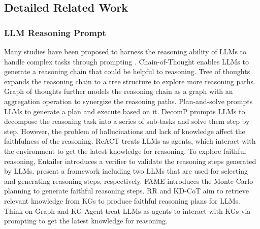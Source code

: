 \subsection{Detailed Related Work}

\subsubsection{LLM Reasoning Prompt}

Many studies have been proposed to harness the reasoning ability of LLMs to handle complex tasks through prompting \citep{wei2022chain,wang2022self,yao2023tree,besta2023graph,pan2023integrating,zheng2023large,jin2023time,jin2024position}. Chain-of-Thought \citep{wei2022chain} enables LLMs to generate a reasoning chain that could be helpful to reasoning. Tree of thoughts \citep{yao2023tree} expands the reasoning chain to a tree structure to explore more reasoning paths. Graph of thoughts \citep{besta2023graph} further models the reasoning chain as a graph with an aggregation operation to synergize the reasoning paths.
Plan-and-solve \citep{wang2023plan} prompts LLMs to generate a plan and execute based on it. DecomP \citep{he2021improving} prompts LLMs to decompose the reasoning task into a series of sub-tasks and solve them step by step. However, the problem of hallucinations and lack of knowledge affect the faithfulness of the reasoning. ReACT \citep{yao2022react} treats LLMs as agents, which interact with the environment to get the latest knowledge for reasoning. To explore faithful reasoning, Entailer \citep{tafjord2022entailer} introduces a verifier to validate the reasoning steps generated by LLMs. \citet{creswell2022faithful} present a framework including two LLMs that are used for selecting and generating reasoning steps, respectively.
FAME \citep{hong2023faithful} introduces the Monte-Carlo planning to generate faithful reasoning steps. RR \citep{he2022rethinking} and KD-CoT \cite{wang2023knowledge} aim to retrieve relevant knowledge from KGs to produce faithful reasoning plans for LLMs. Think-on-Graph \citep{sun2024thinkongraph} and KG-Agent \citep{jiang2024kg} treat LLMs as agents to interact with KGs via prompting to get the latest knowledge for reasoning.


